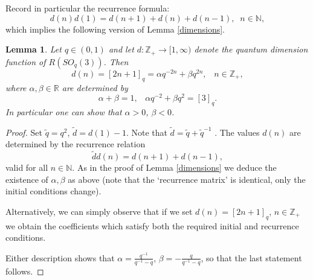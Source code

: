 \documentclass[11 pt, leqno]{amsart}
\newcommand{\NN}{\mathbb{N}}
\newcommand{\ZZ}{\mathbb{Z}}
\DeclareMathOperator{\N}{N}
\newtheorem{lemma}[theorem]{Lemma}
\theoremstyle{definition}
\numberwithin{equation}{section}
\begin{document}
Record in particular the recurrence formula:
\[ d(n) d(1) = d(n+1) + d(n) + d(n-1), \;\; n \in \NN,\]
which implies the following version of Lemma \ref{dimensions}.






\begin{lemma} \label{dimensions2} 
 Let $q \in (0,1)$ and let $d\colon \ZZ_+\to [1,\infty)$ denote the quantum dimension function of $R(SO_q(3))$.  
	Then 
	\[ d(n) = [2n+1]_q = \alpha q^{-2n} + \beta q^{2n}, \;\;\; n \in \ZZ_+,\]
	where $\alpha, \beta \in \mathbb{R}$ are determined by 
	\[ \alpha  + \beta  = 1, \;\;\; \alpha q^{-2} + \beta q^2 = [3]_q.  \]
	In particular one can show that $\alpha>0$, $\beta <0$.
\end{lemma}


\begin{proof}
Set $\tilde{q} =q^2$, $\tilde{d}=d(1)-1$.
Note that  $\tilde{d}=\tilde{q}+\tilde{q}^{-1}$ . %
The values $d(n)$ are determined by the recurrence relation 
	\[ \tilde{d} d(n) = d(n+1) + d(n-1), \]
	valid for all $n \in \NN$. %
	As in the proof of Lemma \ref{dimensions} we deduce the existence of $\alpha, \beta$ as above (note that the `recurrence matrix' is identical, only the initial conditions change).
	
Alternatively, we can simply observe that if we set $d(n) = [2n+1]_q$, $n \in \ZZ_+$ we obtain the coefficients which satisfy both the required initial and recurrence conditions. 
	
Either description shows that $\alpha = \frac{q^{-1}}{q^{-1} - q}$, $\beta = - \frac{q}{{q}^{-1} - q}$, so that the last statement follows. 
	
\end{proof}
\end{document}

